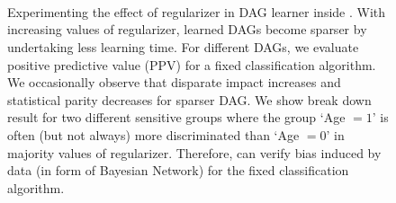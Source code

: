 \begin{figure}
	\begin{center}
		\\
		\\
		\\
	\end{center}
	\caption{Experimenting the effect of regularizer in DAG learner inside {\framework}. With increasing values of regularizer, learned DAGs become sparser by undertaking less learning time. For different DAGs, we evaluate positive predictive value (PPV) for a fixed classification algorithm. We occasionally observe that disparate impact  increases and statistical parity decreases for sparser DAG. We show break down result for two different sensitive groups where the group `Age $ = 1 $' is often (but not always) more discriminated than `Age $ = 0 $'  in majority values of regularizer.  Therefore, {\framework} can verify bias induced by data (in form of Bayesian Network)  for the fixed classification algorithm.}
\end{figure}
\fi





%	
%	
	








